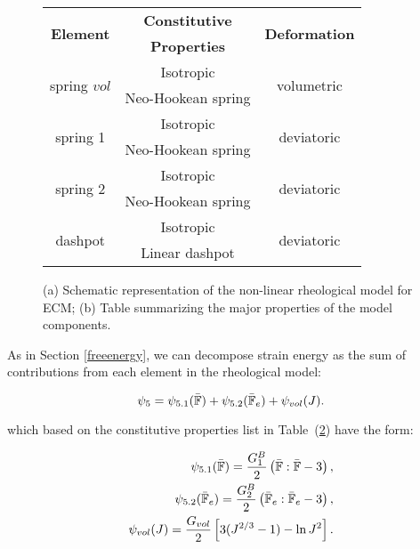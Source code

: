 \begin{figure}
	\begin{subfigure}{0.32\textwidth}
		\centering
		\large
		\def\svgwidth{0.9\linewidth}
		
		\caption{}
		\label{fig1B}
	\end{subfigure}
	\hspace{20mm}
	\begin{subtable}{0.375\textwidth}
		\hspace{-15mm}
		\begin{tabular}{|c | c | c|}	
			\hline
			\multirow{2}{*}{\textbf{ Element } }& \textbf{ Constitutive } & \multirow{2}{*}{\textbf{ Deformation }} \\
			& \textbf{Properties} &\\
			\hline	
			\multirow{2}{*}{ spring $vol$} & Isotropic  & 	\multirow{2}{*}{  volumetric }\\
			&Neo-Hookean spring&\\
			\hline
			\multirow{2}{*}{ spring 1 } & Isotropic  & 	\multirow{2}{*}{  deviatoric }\\
			&Neo-Hookean spring&\\
			\hline
			\multirow{2}{*}{ spring 2 } & Isotropic  & \multirow{2}{*}{  deviatoric }\\
			&Neo-Hookean spring &\\ 
			\hline
			\multirow{2}{*}{dashpot}  & Isotropic  & 	\multirow{2}{*}{deviatoric}\\
			& Linear dashpot & \\
			\hline
		\end{tabular}
		\caption{}
		\label{tabB}
	\end{subtable}
	\caption{(a) Schematic representation of the non-linear rheological model for ECM; (b) Table summarizing the major properties of the model components.}
\end{figure}

As in Section \ref{freeenergy}, we can decompose strain energy as the sum of contributions from each element in the rheological model:

\begin{equation}
\psi_5 = \psi_{5.1}(\bar{\mathbb{F}}) + \psi_{5.2}(\bar{\mathbb{F}}_e) + \psi_{vol}(J).
\end{equation}

which based on the constitutive properties list in Table~(\ref{tabB}) have the form:

\begin{eqnarray}
\psi_{5.1}(\bar{\mathbb{F}}) = \frac{G^B_1}{2} \left(\bar{\mathbb{F}}:\bar{\mathbb{F}} - 3\right),\\
\psi_{5.2}(\bar{\mathbb{F}}_e) = \frac{G^B_2}{2} \left(\bar{\mathbb{F}}_e:\bar{\mathbb{F}}_e - 3 \right),\\
\psi_{vol}(J) = \frac{G_{vol}}{2}\left[3(J^{2/3}-1) -\ln J^2\right].
\end{eqnarray}

